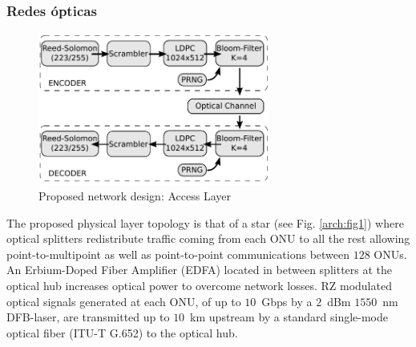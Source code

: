 \documentclass[12pt,twoside,openright]{moddalthesis}
\begin{document}
\subsubsection{Redes ópticas}
\begin{figure}[!t]
  \centering
    \includegraphics[width=3in]{orte01.pdf}
    \caption{Proposed network design: Access Layer}
    \label{arch:chain}
\end{figure}

The proposed physical layer topology is that of a star (see Fig.
\ref{arch:fig1}) where optical splitters redistribute traffic coming
from each ONU to all the rest allowing point-to-multipoint as well as
point-to-point communications between $128$ ONUs.
An Erbium-Doped Fiber Amplifier (EDFA) located in between splitters at
the optical hub increases optical power to overcome network losses.  RZ
modulated optical signals generated at each ONU, of up to $10$~Gbps by a
$2$~dBm $1550$~nm DFB-laser, are transmitted up to $10$~km upstream by a
standard single-mode optical fiber (ITU-T G.652) to the optical hub.
\end{document}
